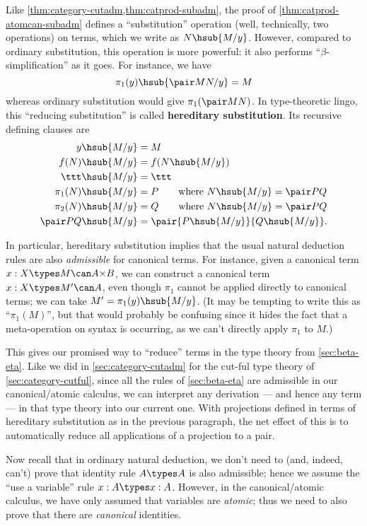 Like \cref{thm:category-cutadm,thm:catprod-subadm}, the proof of \cref{thm:catprod-atomcan-subadm} defines a ``substitution'' operation (well, technically, two operations) on terms, which we write as $N\hsub{M/y}$.
However, compared to ordinary substitution, this operation is more powerful: it also performs ``$\beta$-simplification'' as it goes.
For instance, we have
\[ \pi_1(y)\hsub{\pair M N/y} = M \]
whereas ordinary substitution would give $\pi_1(\pair M N)$.
In type-theoretic lingo, this ``reducing substitution'' is called \textbf{hereditary substitution}.
Its recursive defining clauses are
\begin{align*}
  y\hsub{M/y} &= M\\
  f(N)\hsub{M/y} &= f(N\hsub{M/y})\\
  \ttt\hsub{M/y} &= \ttt\\
  \pi_1(N)\hsub{M/y} &= P \qquad\text{where }N\hsub{M/y}=\pair P Q\\
  \pi_2(N)\hsub{M/y} &= Q \qquad\text{where }N\hsub{M/y}=\pair P Q\\
  \pair P Q \hsub{M/y} &= \pair{P\hsub{M/y}}{Q\hsub{M/y}}.
\end{align*}

In particular, hereditary substitution implies that the usual natural deduction rules are also \emph{admissible} for canonical terms.
For instance, given a canonical term $x:X \types M\can A\times B$, we can construct a canonical term $x:X\types M' \can A$, even though $\pi_1$ cannot be applied directly to canonical terms; we can take $M' = \pi_1(y)\hsub{M/y}$.
(It may be tempting to write this as ``$\pi_1(M)$'', but that would probably be confusing since it hides the fact that a meta-operation on syntax is occurring, as we can't directly apply $\pi_1$ to $M$.)

This gives our promised way to ``reduce'' terms in the type theory from \cref{sec:beta-eta}.
Like we did in \cref{sec:category-cutadm} for the cut-ful type theory of \cref{sec:category-cutful}, since all the rules of \cref{sec:beta-eta} are admissible in our canonical/atomic calculus, we can interpret any derivation --- and hence any term --- in that type theory into our current one.
With projections defined in terms of hereditary substitution as in the previous paragraph, the net effect of this is to automatically reduce all applications of a projection to a pair.

Now recall that in ordinary natural deduction, we don't need to (and, indeed, can't) prove that identity rule $A\types A$ is also admissible; hence we assume the ``use a variable'' rule $x:A\types x:A$.
However, in the canonical/atomic calculus, we have only assumed that variables are \emph{atomic}; thus we need to also prove that there are \emph{canonical} identities.

